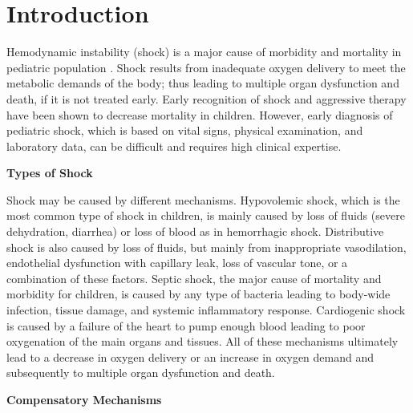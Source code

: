 \documentclass[
   technote
]{phildoc}
\begin{document}
\Tnotefrontmatter
\Large

\chapter{Introduction}
\label{introduction}

Hemodynamic instability (shock) is a major cause of morbidity and mortality in pediatric population \cite{Ayse:2008}. Shock results from inadequate oxygen delivery to meet the metabolic demands of the body; thus leading to multiple organ dysfunction and death, if it is not treated early. Early recognition of shock and aggressive therapy have been shown to decrease mortality in children. However, early diagnosis of pediatric shock, which is based on vital signs, physical examination, and laboratory data, can be difficult and requires high clinical expertise.

\noindent\textbf{Types of Shock}

Shock may be caused by different mechanisms. Hypovolemic shock, which is the most common type of shock in children, is mainly caused by loss of fluids (severe dehydration, diarrhea) or loss of blood as in hemorrhagic shock. Distributive shock is also caused by loss of fluids, but mainly from inappropriate vasodilation, endothelial dysfunction with capillary leak, loss of vascular tone, or a combination of these factors. Septic shock, the major cause of mortality and morbidity for children, is caused by any type of bacteria leading to body-wide infection, tissue damage, and systemic inflammatory response. Cardiogenic shock is caused by a failure of the heart to pump enough blood leading to poor oxygenation of the main organs and tissues. All of these mechanisms ultimately lead to a decrease in oxygen delivery or an increase in oxygen demand and subsequently to multiple organ dysfunction and death.     

\noindent\textbf{Compensatory Mechanisms}
\end{document}
